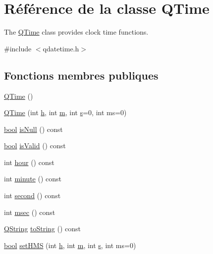 \hypertarget{class_q_time}{}\section{Référence de la classe Q\+Time}
\label{class_q_time}


The \hyperlink{class_q_time}{Q\+Time} class provides clock time functions.  




{\ttfamily \#include $<$qdatetime.\+h$>$}

\subsection*{Fonctions membres publiques}
\begin{DoxyCompactItemize}
\item 
\hyperlink{class_q_time_acf8e9864d7d793eda72d68481e9c2387}{Q\+Time} ()
\item 
\hyperlink{class_q_time_a02d9df9fff2be1e261ae9a4b60742f5f}{Q\+Time} (int \hyperlink{060__command__switch_8tcl_af96fd0966e32a310a0778d2e5c357700}{h}, int \hyperlink{060__command__switch_8tcl_a78d127e8bda64d4471ac811ad512fbd9}{m}, int \hyperlink{060__command__switch_8tcl_a011c73f2dbb87635a3b4206c72355f6e}{s}=0, int ms=0)
\item 
\hyperlink{qglobal_8h_a1062901a7428fdd9c7f180f5e01ea056}{bool} \hyperlink{class_q_time_aceb21bec379a6e3fd9f179ea50767ba6}{is\+Null} () const 
\item 
\hyperlink{qglobal_8h_a1062901a7428fdd9c7f180f5e01ea056}{bool} \hyperlink{class_q_time_a74e28de56afb58c417756daba5647278}{is\+Valid} () const 
\item 
int \hyperlink{class_q_time_ab08f1d63181f7682b5d585329b20f6a0}{hour} () const 
\item 
int \hyperlink{class_q_time_a77a8a0a830be56dac73bf51fe0eb724d}{minute} () const 
\item 
int \hyperlink{class_q_time_a6602081b659eb25b34d2df25df162510}{second} () const 
\item 
int \hyperlink{class_q_time_ae6a7425b7a638ec534304bf0a01f41dc}{msec} () const 
\item 
\hyperlink{class_q_string}{Q\+String} \hyperlink{class_q_time_a4cbd70ad4fa6b17fd10c5ae0f23784b2}{to\+String} () const 
\item 
\hyperlink{qglobal_8h_a1062901a7428fdd9c7f180f5e01ea056}{bool} \hyperlink{class_q_time_a9c52b0963595ba4acd9b5922a5beeb06}{set\+H\+M\+S} (int \hyperlink{060__command__switch_8tcl_af96fd0966e32a310a0778d2e5c357700}{h}, int \hyperlink{060__command__switch_8tcl_a78d127e8bda64d4471ac811ad512fbd9}{m}, int \hyperlink{060__command__switch_8tcl_a011c73f2dbb87635a3b4206c72355f6e}{s}, int ms=0)

\end{DoxyCompactItemize}
